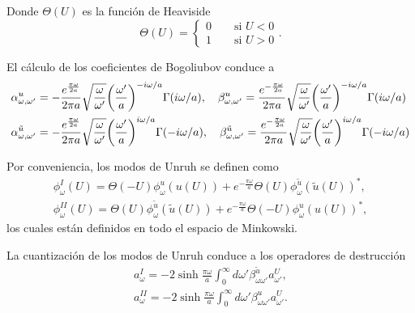 Donde $\Theta(U)$ es la función de Heaviside 
\begin{equation}
   \Theta(U)=
  \begin{cases}
    0\qquad \text{si }U<0 \\
    1\qquad \text{si }U>0
  \end{cases}
  .
\end{equation}

El cálculo de los coeficientes de Bogoliubov conduce a 
\begin{equation}
  \begin{aligned}
    &\alpha_{\omega,\omega'}^{ u} = -\frac{e^{\frac{\pi\omega}{2 a}}}{2\pi a}\sqrt{\frac{\omega}{\omega'}}\qty(\frac{\omega'}{a})^{-i\omega/a}
    \Gamma(i\omega/a), \quad
    \beta_{\omega,\omega'}^{ u} = \frac{e^{-\frac{\pi\omega}{2 a}}}{2\pi a}\sqrt{\frac{\omega}{\omega'}}\qty(\frac{\omega'}{a})^{-i\omega/a}
    \Gamma(i\omega/a)\\
    &\alpha_{\omega,\omega'}^{\tilde u} = -\frac{e^{\frac{\pi\omega}{2 a}}}{2\pi a}\sqrt{\frac{\omega}{\omega'}}\qty(\frac{\omega'}{a})^{i\omega/a}
    \Gamma(-i\omega/a), \quad
    \beta_{\omega,\omega'}^{\tilde u} = \frac{e^{-\frac{\pi\omega}{2 a}}}{2\pi a}\sqrt{\frac{\omega}{\omega'}}\qty(\frac{\omega'}{a})^{i\omega/a} 
    \Gamma(-i\omega/a)
  \end{aligned}
\end{equation}

Por conveniencia, los modos de Unruh se definen como
\begin{equation}
  \begin{aligned}
    \phi^I_\omega(U)=\Theta(-U)\phi^u_\omega(u(U)) + e^{-\frac{\pi\omega}{a}}\Theta(U)\phi_\omega^{\tilde u}(\tilde u(U))^*,\\
    \phi^{II}_\omega(U)=\Theta(U)\phi^{\tilde u}_\omega(\tilde u(U)) + e^{-\frac{\pi\omega}{a}}\Theta(-U)\phi_\omega^{u}(u(U))^*,
  \end{aligned}
\end{equation}
los cuales están definidos en todo el espacio de Minkowski.

La cuantización de los modos de Unruh conduce a los operadores de destrucción
\begin{equation}
  \begin{aligned}
    a_\omega^I = -2\sinh\frac{\pi\omega}{a}\int_0^\infty d\omega' \beta_{\omega\omega'}^{\tilde u} a_{\omega'}^U,\\
    a_\omega^{II} = -2\sinh\frac{\pi\omega}{a}\int_0^\infty d\omega' \beta_{\omega\omega'}^{u} a_{\omega'}^U.\\
  \end{aligned}
\end{equation}

